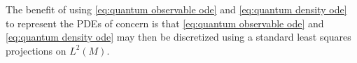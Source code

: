\documentclass[final,leqno]{siamltex1213}
\begin{document}
The benefit of using \eqref{eq:quantum observable ode} and \eqref{eq:quantum density ode} to represent the PDEs of concern is that \eqref{eq:quantum observable ode} and \eqref{eq:quantum density ode} may then be discretized using a standard least squares projections on $L^{2}(M)$.

%
%
\end{document}
